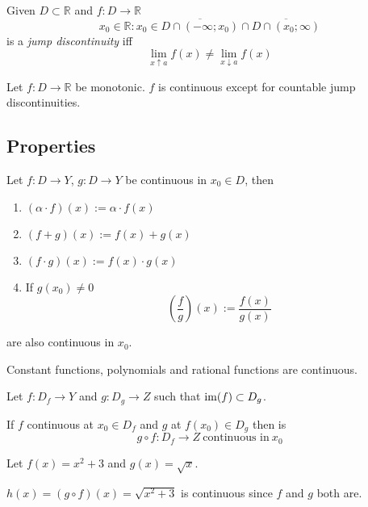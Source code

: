 \begin{definition}
   Given \(D \subset \mathbb{R}\) and \(f: D \to \mathbb{R}\)
   \[x_0 \in \mathbb{R}: x_0 \in \overline{D \cap (-\infty; x_0)} \cap \overline{D \cap (x_0; \infty)}\]
   is a \emph{jump discontinuity} iff
   \[\lim_{x \uparrow a} f(x) \neq \lim_{x \downarrow a} f(x)\]
\end{definition}

\begin{theorem}
   Let \(f:D \to \mathbb{R}\) be monotonic.
   \(f\) is continuous except for countable jump discontinuities.
\end{theorem}

\subsection{Properties}
\begin{proposition}
   Let \(f: D \to Y\), \(g: D \to Y\) be continuous in \(x_0 \in D\), then
   \begin{enumerate}[label=\roman*, align=Center]
      \item \((\alpha \cdot f)(x) := \alpha \cdot f(x)\)
      \item \((f + g)(x) := f(x) + g(x)\)
      \item \((f \cdot g)(x) := f(x) \cdot g(x)\)
      \item If \(g(x_0) \neq 0\)
         \[\left(\frac{f}{g}\right)(x) := \frac{f(x)}{g(x)}\]
   \end{enumerate}
   are also continuous in \(x_0\).
\end{proposition}

\begin{corollary}
   Constant functions, polynomials and rational functions are continuous.
\end{corollary}

\begin{proposition}\label{pro:contin_continuation}
   Let \(f: D_f \to Y\) and \(g: D_g \to Z\) such that \(\operatorname{im}(f) \subset D_g\).

   If \(f\) continuous at \(x_0 \in D_f\) and \(g\) at \(f(x_0) \in D_g\) then is
   \[g \circ f: D_f \to Z~\text{continuous in}~x_0\]
\end{proposition}
\begin{example}
   Let \(f(x) = x^2 + 3\) and \(g(x) = \sqrt{x}\).

   \(h(x) = (g \circ f)(x) = \sqrt{x^2 + 3}\) is continuous since \(f\) and \(g\) both are.
\end{example}

